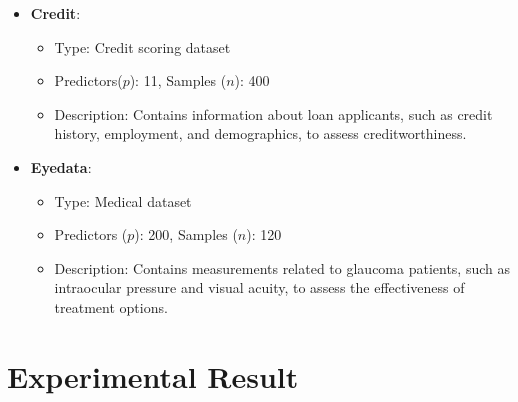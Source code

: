 \begin{itemize}
	\item \textbf{Credit}:
	\begin{itemize}
		\item Type: Credit scoring dataset
		\item Predictors($p$): 11, Samples ($n$): 400
		\item Description: Contains information about loan applicants, such as credit history, employment, and demographics, to assess creditworthiness.
	\end{itemize}
	
	\item \textbf{Eyedata}:
	\begin{itemize}
		\item Type: Medical dataset
		\item Predictors ($p$): 200, Samples ($n$): 120
		\item Description: Contains measurements related to glaucoma patients, such as intraocular pressure and visual acuity, to assess the effectiveness of treatment options.
	\end{itemize}
\end{itemize}

\section{Experimental Result}
